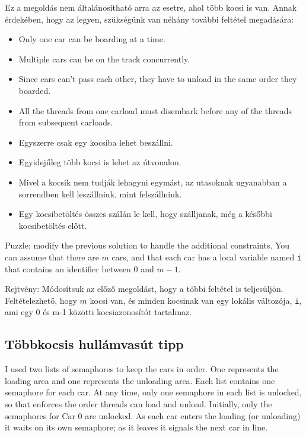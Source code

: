 \documentclass{book}
\newcommand{\clearemptydoublepage}{\newpage\cleardoublepage}
\begin{document}
Ez a megoldás nem általánosítható arra az esetre, ahol több kocsi is van. Annak érdekében, hogy
az legyen, szükségünk van néhány további feltétel megadására:

\begin{itemize}

\item Only one car can be boarding at a time.

\item Multiple cars can be on the track concurrently.

\item Since cars can't pass each other, they have to unload
in the same order they boarded.

\item All the threads from one carload must disembark before
any of the threads from subsequent carloads.

\end{itemize}

\begin{itemize}

\item Egyszerre csak egy kocsiba lehet beszállni.
\item Egyidejűleg több kocsi is lehet az útvonalon.
\item Mivel a kocsik nem tudják lehagyni egymást, az utasoknak ugyanabban a sorrendben
kell leszállniuk, mint felszállniuk.
\item Egy kocsibetöltés összes szálán le kell, hogy szálljanak, még a későbbi kocsibetöltés
előtt.

\end{itemize}

Puzzle: modify
the previous solution to handle the additional constraints.
You can assume that there are $m$ cars, and that
each car has a local variable named {\tt i}
that contains an identifier between 0 and $m-1$.


Rejtvény: Módosítsuk az előző megoldást, hogy a többi feltétel is teljesüljön. Feltételezhető,
hogy $m$ kocsi van, és minden kocsinak van egy lokális változója, {\tt i}, ami egy 0 és m-1 közötti
kocsiazonosítót tartalmaz.

\clearemptydoublepage
\subsection{Többkocsis hullámvasút tipp}

I used two lists of semaphores to keep the cars in order.  One
represents the loading area and one represents the unloading area.
Each list contains one semaphore for each car.
At any time, only one semaphore in each
list is unlocked, so that enforces the order threads can
load and unload.
Initially, only the semaphores for Car 0 are unlocked.
As each car enters the
loading (or unloading) it waits on its own semaphore; as it leaves it
signals the next car in line.
\end{document}
